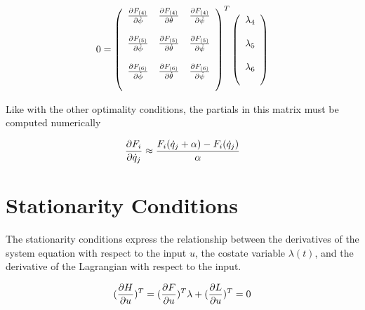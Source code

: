 \begin{equation}
    0 = \left(
    \begin{array}{c c c }

    \frac{\partial F_{(4)}}{\partial \dot \phi} & \frac{\partial F_{(4)}}{\partial \dot \theta} & \frac{\partial F_{(4)}}{\partial \dot \psi}\\\\

    \frac{\partial F_{(5)}}{\partial \dot \phi} & \frac{\partial F_{(5)}}{\partial \dot \theta} & \frac{\partial F_{(5)}}{\partial \dot \psi}\\\\

     \frac{\partial F_{(6)}}{\partial \dot \phi} & \frac{\partial F_{(6)}}{\partial \dot \theta} & \frac{\partial F_{(6)}}{\partial \dot \psi}\\\\

    \end{array}\right)^T\left(
    \begin{array}{c}
    \lambda_4\\\\
    \lambda_5\\\\
    \lambda_6\\\\
    \end{array}\right)
\end{equation}

Like with the other optimality conditions, the partials in this matrix must be computed numerically

\begin{equation}
    \frac{\partial F_i}{\partial \dot q_j} \approx \frac{ F_i(\dot q_j + \alpha) - F_i(\dot q_j)  }{\alpha}
\end{equation}



\section{Stationarity Conditions}

The stationarity conditions express the relationship between the derivatives of the system equation with respect to the input $u$, the costate variable $\lambda(t)$, and the derivative of the Lagrangian with respect to the input.

\begin{equation}
    (\frac{\partial H}{\partial u})^T = (\frac{\partial F}{\partial u})^T \lambda + (\frac{\partial L}{\partial u})^T = 0
\end{equation}


